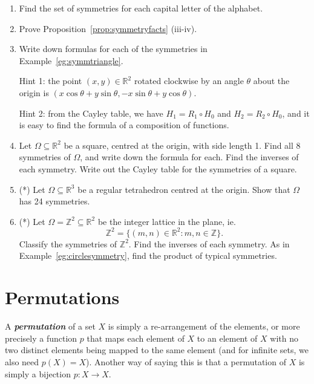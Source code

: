 \documentclass[10pt]{book}
\theoremstyle{break}
\newcommand{\defn}[2]{\textsl{\textbf{#1\index{#2|emph}}}}
\newcommand{\integers}{\ensuremath{\mathbb{Z}}}
\newcommand{\reals}{\ensuremath{\mathbb{R}}}
\begin{document}
\begin{enumerate}
  \item Find the set of symmetries for each capital letter of the alphabet.
  
  \item Prove Proposition~\ref{prop:symmetryfacts} (iii-iv).
  
  \item Write down formulas for each of the symmetries in
    Example~\ref{eg:symmtriangle}.
    
    Hint 1: the point $(x,y) \in \reals^{2}$ rotated clockwise by an angle
    $\theta$ about the origin is $(x\cos \theta + y\sin \theta, -x\sin \theta +
    y\cos \theta)$.
    
    Hint 2: from the Cayley table, we have $H_{1} = R_{1} \circ H_{0}$ and
    $H_{2} = R_{2} \circ H_{0}$, and it is easy to find the formula of a
    composition of functions.
  
  \item Let $\Omega \subseteq \reals^{2}$ be a square, centred at the origin,
    with side length 1.
    Find all 8 symmetries of $\Omega$, and write down the formula for each. 
    Find the inverses of each symmetry.
    Write out the Cayley table for the symmetries of a square.
  
  \item\label{ex:symtetra} (*) Let $\Omega \subseteq \reals^{3}$ be a regular tetrahedron
    centred at the origin.  Show that $\Omega$ has 24 symmetries.
  
  \item (*) Let $\Omega = \integers^{2} \subseteq \reals^{2}$ be the integer
    lattice in the plane, ie.
    \[
      \integers^{2} = \{ (m,n) \in \reals^{2} : m, n \in \integers \}.
    \]
    Classify the symmetries of $\integers^{2}$.
    Find the inverses of each symmetry.
    As in Example~\ref{eg:circlesymmetry}, find the product of typical symmetries.
\end{enumerate}

\section{Permutations}

A \defn{permutation}{permutation} of a set $X$ is simply a re-arrangement of
the elements, or more precisely a function $p$ that maps each element of $X$ to
an element of $X$ with no two distinct elements being mapped to the same
element (and for infinite sets, we also need $p(X) = X$).  Another way of
saying this is that a permutation of $X$ is simply a bijection $p: X \to X$.
\end{document}
